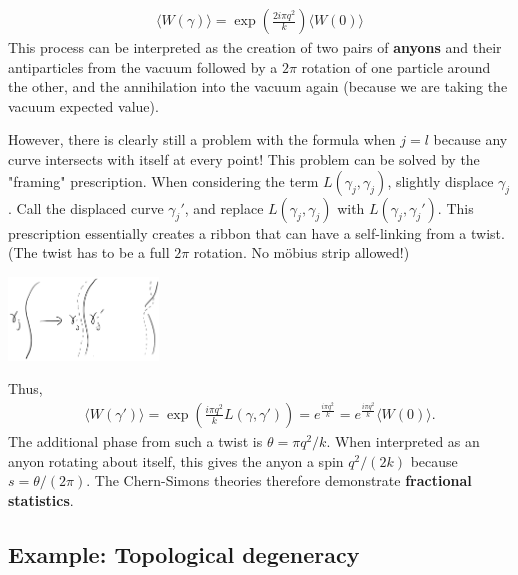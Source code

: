 \documentclass[aps,nofootinbib]{revtex4}
\begin{document}
\begin{align}\label{anyon phase}
\langle W(\gamma) \rangle = \exp \left(\frac{2 i\pi q^2}{k} \right) \langle W(0) \rangle
\end{align}
This process can be interpreted as the creation of two pairs of {\bf anyons} and their antiparticles from the vacuum  followed by a $2\pi$ rotation of one particle around the other, and the annihilation into the vacuum again (because we are taking the vacuum expected value). 

However, there is clearly still a problem with the formula when $j=l$ because any curve intersects with itself at every point! This problem can be solved by the "framing" prescription. When considering the term $L(\gamma_j,\gamma_j)$, slightly displace $\gamma_j$. Call the displaced curve $\gamma_j'$, and replace $L(\gamma_j,\gamma_j)$ with $L(\gamma_j,\gamma_j')$. This prescription essentially creates a ribbon that can have a self-linking from a twist. (The twist has to be a full $2\pi$ rotation. No m{\"o}bius strip allowed!)
\begin{center}
\includegraphics[width=0.3\textwidth]{ribbon.png}
\end{center}
Thus,
\begin{align}
\langle W(\gamma') \rangle = \exp \left( \frac{i\pi q^2}{k} L(\gamma,\gamma') \right) = e^{\frac{i\pi q^2}{k}} = e^{\frac{i\pi q^2}{k}} \langle W(0) \rangle. 
\end{align}
The additional phase from such a twist is $\theta = \pi q^2/k$. When interpreted as an anyon rotating about itself, this gives the anyon a spin $q^2/(2k)$ because $s = \theta/(2\pi)$. The Chern-Simons theories therefore demonstrate {\bf fractional statistics}.

\subsection{Example: Topological degeneracy}\label{degeneracy}
\end{document}
